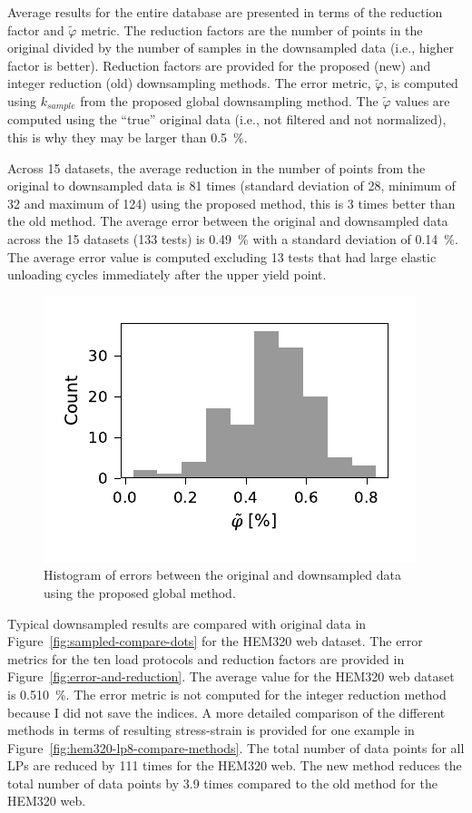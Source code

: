 \documentclass[a4paper,11pt]{article}
\begin{document}
Average results for the entire database are presented in terms of the reduction factor and $\tilde{\varphi}$ metric.
The reduction factors are the number of points in the original divided by the number of samples in the downsampled data (i.e., higher factor is better).
Reduction factors are provided for the proposed (new) and integer reduction (old) downsampling methods.
The error metric, $\tilde{\varphi}$, is computed using $k_{sample}$ from the proposed global downsampling method.
The $\tilde{\varphi}$ values are computed using the ``true'' original data (i.e., not filtered and not normalized), this is why they may be larger than 0.5~\%.

Across 15 datasets, the average reduction in the number of points from the original to downsampled data is 81 times (standard deviation of 28, minimum of 32 and maximum of 124) using the proposed method, this is 3 times better than the old method.
The average error between the original and downsampled data across the 15 datasets (133 tests) is 0.49~\% with a standard deviation of 0.14~\%.
The average error value is computed excluding 13 tests that had large elastic unloading cycles immediately after the upper yield point.

\begin{figure}
    \centering
    \includegraphics{error_histogram.pdf}
    \caption{Histogram of errors between the original and downsampled data using the proposed global method.}
    \label{fig:histogram-error-all-datasets}
\end{figure}

Typical downsampled results are compared with original data in Figure~\ref{fig:sampled-compare-dots} for the HEM320 web dataset.
The error metrics for the ten load protocols and reduction factors are provided in Figure~\ref{fig:error-and-reduction}.
The average value for the HEM320 web dataset is 0.510~\%.
The error metric is not computed for the integer reduction method because I did not save the indices.
A more detailed comparison of the different methods in terms of resulting stress-strain is provided for one example in Figure~\ref{fig:hem320-lp8-compare-methods}.
The total number of data points for all LPs are reduced by 111 times for the HEM320 web.
The new method reduces the total number of data points by 3.9 times compared to the old method for the HEM320 web.
\end{document}
